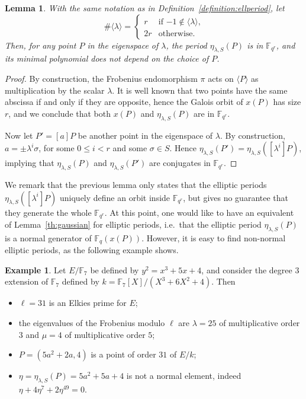 \documentclass[12pt]{article}
\theoremstyle{plain}
\newtheorem{lemma}[theorem]{Lemma}
\theoremstyle{definition}
\newtheorem{example}[theorem]{Example}
\def\F{\ensuremath{\mathbb{F}}}
\begin{document}
\begin{lemma}
  \label{lemma:ellperiods-order}
  With the same notation as in Definition~\ref{definition:ellperiod},
  let
  \begin{equation*}
    \#\langle\lambda\rangle =
    \begin{cases}
      r & \text{if $-1\notin\langle\lambda\rangle$,}\\
      2r & \text{otherwise.}
    \end{cases}
  \end{equation*}
  Then, for any point $P$ in the eigenspace of $\lambda$, the period
  $\eta_{\lambda,S}(P)$ is in $\F_{q^r}$, and its minimal polynomial
  does not depend on the choice of $P$.
\end{lemma}
\begin{proof}
  By construction, the Frobenius endomorphism $\pi$ acts on
  $\langle P\rangle$ as multiplication by the scalar $\lambda$. It is
  well known that two points have the same abscissa if and only if
  they are opposite, hence the Galois orbit of $x(P)$ has size $r$,
  and we conclude that both $x(P)$ and $\eta_{\lambda,S}(P)$ are in
  $\F_{q^r}$.

  Now let $P'=[a]P$ be another point in the eigenspace of
  $\lambda$. By construction, $a=\pm \lambda^i\sigma$, for some
  $0\le i<r$ and some $\sigma\in S$. Hence
  $\eta_{\lambda,S}(P')=\eta_{\lambda,S}([\lambda^i]P)$, implying that
  $\eta_{\lambda,S}(P)$ and $\eta_{\lambda,S}(P')$ are conjugates in
  $\F_{q^r}$.
\end{proof}

We remark that the previous lemma only states that the elliptic
periods $\eta_{\lambda,S}([\lambda^i]P)$ uniquely define an orbit
inside $\F_{q^r}$, but gives no guarantee that they generate the whole
$\F_{q^r}$. %
At this point, one would like to have an equivalent of
Lemma~\ref{th:gaussian} for elliptic periods, i.e.\ that the elliptic
period $\eta_{\lambda,S}(P)$ is a normal generator of $\F_q(x(P))$.
However, it is easy to find non-normal elliptic periods, as the
following example shows.

\begin{example}
\label{ex:non-normal}
  Let $E/\F_7$ be defined by $y^2 = x^3 + 5 x + 4$, and consider the
  degree $3$ extension of $\F_7$ defined by
  $k=\F_7[X]/(X^3 + 6 X^2 + 4)$. Then
  \begin{itemize}
  \item $\ell = 31$ is an Elkies prime for $E$;
  \item the eigenvalues of the Frobenius modulo $\ell$ are
    $\lambda = 25$ of multiplicative order $3$ and $\mu = 4$ of
    multiplicative order $5$;
  \item $P = (5 a^2+2 a, 4)$ is a point of order $31$ of $E/k$;
  \item $\eta=\eta_{\lambda,S}(P) = 5 a^2 + 5 a + 4$ is not a normal
    element, indeed
    $\eta + 4 \eta^7 + 2 \eta^{49} = 0$.
  \end{itemize}
\end{example}
\end{document}
